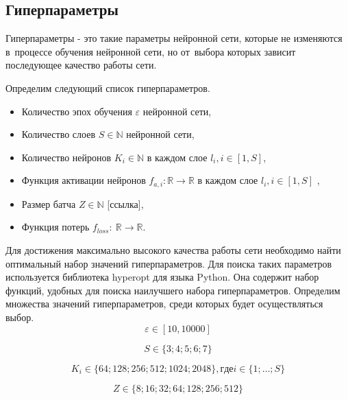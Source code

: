 \subsection{Гиперпараметры}\label{subsec:hyperparameters}

\begin{definition}
  Гиперпараметры - это такие параметры нейронной сети, которые не изменяются в~процессе обучения нейронной сети, но от~выбора которых зависит последующее качество работы сети.
\end{definition}

Определим следующий список гиперпараметров.
\begin{itemize}
  \item Количество эпох обучения $\mathbb{\varepsilon}$ нейронной сети,
  \item Количество слоев $S \in \mathbb{N}$ нейронной сети,
  \item Количество нейронов $K_i \in \mathbb{N}$ в каждом слое $l_i, i \in [1, S]$,
  \item Функция активации\cite[раздел activations]{bib:keras} нейронов $f_{a,i}: \mathbb{R} \rightarrow \mathbb{R}$ в каждом слое $l_i, i \in [1, S]$ ,
  \item Размер батча $Z \in \mathbb{N}$ [ссылка],
  \item Функция потерь\cite[раздел losses]{bib:keras} $f_{loss}:~\mathbb{R} \rightarrow \mathbb{R}$.
\end{itemize}

Для достижения максимально высокого качества работы сети необходимо найти оптимальный набор значений гиперпараметров.
Для поиска таких параметров используется библиотека hyperopt\cite{bib:hyperopt} для языка Python.
Она содержит набор функций, удобных для поиска наилучшего набора гиперпараметров.
Определим множества значений гиперпараметров, среди которых будет осуществляться выбор.
\begin{equation}\label{eq:hyper1}
  \mathbb{\varepsilon} \in [10, 10000]
\end{equation}

\begin{equation}\label{eq:hyper1}
  S \in \{3; 4; 5; 6; 7\}
\end{equation}

\begin{equation}\label{eq:hyper2}
  K_i \in \{64; 128; 256; 512; 1024; 2048\}, где i \in \{1; \dots; S\}
\end{equation}

\begin{equation}\label{eq:hyper3}
  Z \in \{8; 16; 32; 64; 128; 256; 512\}
\end{equation}

